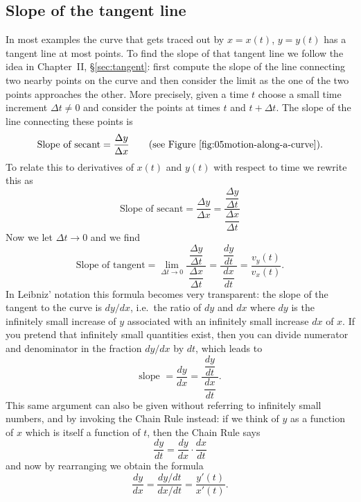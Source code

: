 \subsection{Slope of the tangent line} %
In most examples the curve that gets traced out by $x=x(t)$, $y=y(t)$ has a
tangent line at most points.  To find the slope of that tangent line we follow the idea in
Chapter~II, \S\ref{sec:tangent}: first compute the slope of the line connecting two nearby
points on the curve and then consider the limit as the one of the two points
approaches the other.  More precisely, given a time $t$ choose a small time
increment $\Delta t\neq0$ and consider the points at times $t$ and $t+\Delta
t$. The slope of the line connecting these points is
\[
\text{Slope of secant} = \frac{\Delta y}{\Delta x}
\qquad
\text{(see Figure~\ref{fig:05motion-along-a-curve}).}
\]
To relate this to derivatives of $x(t)$ and $y(t)$ with respect to time we
rewrite this as
\[
\text{Slope of secant} = \frac{\Delta y}{\Delta x} = \frac{\dfrac{\Delta
    y}{\Delta t}}{\dfrac{\Delta x}{\Delta t}}
\]
Now we let $\Delta t\to 0$ and we find
\begin{equation}
  \text{Slope of tangent}
  = \lim_{\Delta t\to0}
  \frac{\;\dfrac{\Delta y}{\Delta t}\;}{\dfrac{\Delta x}{\Delta t}}
  =\frac{\;\dfrac{dy}{dt}\;}{\dfrac{dx}{dt}}
  =\frac{v_y(t)} {v_x(t)}.
  \label{eq:05slope-of-tangent-parametrized-curve}
\end{equation}
In Leibniz' notation this formula becomes very transparent: the slope of the
tangent to the curve is $dy/dx$, i.e.~the ratio of $dy$ and $dx$ where $dy$ is
the infinitely small increase of $y$ associated with an infinitely small
increase $dx$ of $x$.  If you pretend that infinitely small quantities exist,
then you can divide numerator and denominator in the fraction $dy/dx$ by $dt$,
which leads to
\[
\text{slope }= \frac{dy} {dx} = \frac{\;\dfrac{dy}{dt}\;}{\dfrac{dx} {dt}}.
\]
This same argument can also be given without referring to infinitely small
numbers, and by invoking the Chain Rule instead: if we think of $y$ as a
function of $x$ which is itself a function of $t$, then the Chain Rule says
\begin{equation*}
  \frac{dy}{dt} = \dfrac{dy}{dx} \cdot \dfrac{dx}{dt}
\end{equation*}
and now by rearranging we obtain the formula
\begin{equation*}
  \frac{dy}{dx} = \dfrac{dy/dt}{dx/dt} = \dfrac{y'(t)}{x'(t)}.
\end{equation*}


